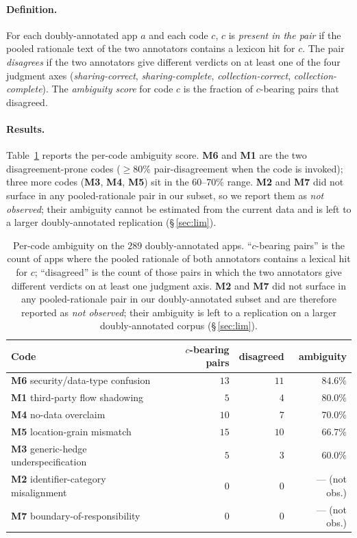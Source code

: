 \documentclass[11pt,a4paper]{article}
\newcommand{\code}[1]{\textsf{\textbf{#1}}}
\begin{document}
\paragraph{Definition.} For each doubly-annotated app $a$ and each
code $c$, $c$ is \emph{present in the pair} if the pooled rationale
text of the two annotators contains a lexicon hit for $c$. The pair
\emph{disagrees} if the two annotators give different verdicts on at
least one of the four judgment axes
(\emph{sharing-correct}, \emph{sharing-complete},
\emph{collection-correct}, \emph{collection-complete}). The
\emph{ambiguity score} for code $c$ is the fraction of $c$-bearing
pairs that disagreed.

\paragraph{Results.} Table~\ref{tab:ambiguity} reports the per-code
ambiguity score. \code{M6} and \code{M1} are the two
disagreement-prone codes ($\geq 80\%$ pair-disagreement when the code
is invoked); three more codes (\code{M3}, \code{M4}, \code{M5}) sit
in the $60$--$70\%$ range. \code{M2} and \code{M7} did not surface in
any pooled-rationale pair in our subset, so we report them as
\emph{not observed}; their ambiguity cannot be estimated from the
current data and is left to a larger doubly-annotated replication
(\S\,\ref{sec:lim}).

\begin{table}[t]
\centering\small
\caption{Per-code ambiguity on the $289$ doubly-annotated apps.
``$c$-bearing pairs'' is the count of apps where the pooled rationale
of both annotators contains a lexical hit for $c$; ``disagreed'' is the
count of those pairs in which the two annotators give different
verdicts on at least one judgment axis. \code{M2} and \code{M7} did
not surface in any pooled-rationale pair in our doubly-annotated
subset and are therefore reported as \emph{not observed}; their
ambiguity is left to a replication on a larger doubly-annotated
corpus (\S\,\ref{sec:lim}).}
\label{tab:ambiguity}
\begin{tabular}{lrrr}
\toprule
\textbf{Code} & \textbf{$c$-bearing pairs} & \textbf{disagreed} & \textbf{ambiguity} \\
\midrule
\code{M6} security/data-type confusion     & $13$ & $11$ & $84.6\%$  \\
\code{M1} third-party flow shadowing       & $5$  & $4$  & $80.0\%$  \\
\code{M4} no-data overclaim                & $10$ & $7$  & $70.0\%$  \\
\code{M5} location-grain mismatch          & $15$ & $10$ & $66.7\%$  \\
\code{M3} generic-hedge underspecification & $5$  & $3$  & $60.0\%$  \\
\code{M2} identifier-category misalignment & $0$  & $0$  & --- (not obs.) \\
\code{M7} boundary-of-responsibility       & $0$  & $0$  & --- (not obs.) \\
\bottomrule
\end{tabular}
\end{table}
\end{document}
